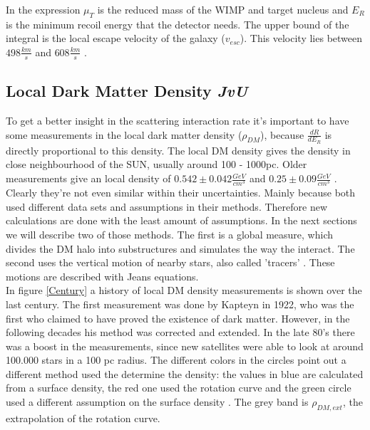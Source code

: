 \documentclass{article}
\begin{document}
In the expression $\mu_{T}$ is the reduced mass of the WIMP and target nucleus and $E_{R}$ is the minimum recoil energy that the detector needs. The upper bound of the integral is the local escape velocity of the galaxy ($v_{esc}$). This velocity lies between $498\frac{km}{s}$ and $608\frac{km}{s}$ \cite{Smith:2006ym}. 

\FloatBarrier
\newpage
\subsection{Local Dark Matter Density \small{\textit{JvU}}} \label{Local_DM_Density}


To get a better insight in the scattering interaction rate it's important to have some measurements in the local dark matter density ($\rho_{DM}$), because $\frac{dR}{dE_{R}}$ is directly proportional to this density. The local DM density gives the density in close neighbourhood of the SUN, usually around 100 - 1000pc. Older measurements give an local density of $0.542 \pm 0.042 \frac{GeV}{cm^{3}}$ \cite{BT2} and $0.25 \pm 0.09 \frac{GeV}{cm^{3}}$ \cite{Zhang:2012rsb}. Clearly they're not even similar within their uncertainties. Mainly because both used different data sets and assumptions in their methods. Therefore new calculations are done with the least amount of assumptions. In the next sections we will describe two of those methods. The first is a global measure, which divides the DM halo into substructures and simulates the way the interact. The second uses the vertical motion of nearby stars, also called 'tracers' \cite{Read:2014qva}. These motions are described with Jeans equations.\\
In figure \ref{Century} a history of local DM density measurements is shown over the last century. The first measurement was done by Kapteyn in 1922, who was the first who claimed to have proved the existence of dark matter. However, in the following decades his method was corrected and extended. In the late 80's there was a boost in the measurements, since new satellites were able to look at around 100.000 stars in a 100 pc radius. The different colors in the circles point out a different method used the determine the density: the values in blue are calculated from a surface density, the red one used the rotation curve and the green circle used a different assumption on the surface density \cite{Read:2014qva}. The grey band is $\rho_{DM,ext}$, the extrapolation of the rotation curve. 
\FloatBarrier
\end{document}
